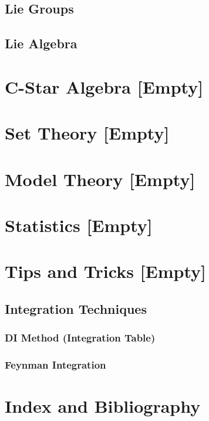 \documentclass[12pt, english]{book}
\begin{document}
	\chapter{Lie Groups}
	
	\chapter{Lie Algebra}
	
	\part{C-Star Algebra [Empty]} \label{C-Star Algebra Part}
	
	\part{Set Theory [Empty]} \label{Set Theory Part}
	
	\part{Model Theory [Empty]} \label{Model Theory Part}
	
	\part{Statistics [Empty]} \label{Statistics Part}
	\part{Tips and Tricks [Empty]} \label{Tips and Tricks Part}
	
	\chapter{Integration Techniques} \label{Integration Techniques Chapter - Tips and Tricks}
	
	\section{DI Method (Integration Table)} \label{DI Method Section - Tips and Tricks}
	
	\section{Feynman Integration} \label{Feynman Integration Section - Tips and Tricks}
	
	\backmatter
	\part{Index and Bibliography} \label{Index and Bibliography Part}
	
	\printindex
	
	
	\typeout{}
	
	
\end{document}
